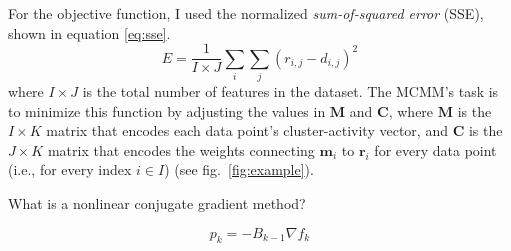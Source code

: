 For the objective function, I used the normalized \emph{sum-of-squared error} (SSE), 
shown in equation \eqref{eq:sse}.
\begin{equation} \label{eq:sse}
E = \frac{1}{I \times J} \sum_{i} \sum_{j} {(r_{i,j} - d_{i,j})}^2
\end{equation}
 where $I \times J$ is the total number of features in the dataset.
The MCMM's task is to minimize this function by adjusting the
 values in $\mathbf{M}$ and $\mathbf{C}$, where
$\mathbf{M}$ is the $I \times K$ matrix that
encodes each data point's cluster-activity vector, 
and $\mathbf{C}$ is the $J \times K$ matrix that
encodes the weights connecting $\mathbf{m}_i$ to $\mathbf{r}_i$ for every data point (i.e., for every index $i \in I$) (see fig.~\ref{fig:example}). 


What is a nonlinear conjugate gradient method?

\begin{equation}
p_k = -B_{k-1}\nabla f_k
\end{equation}

